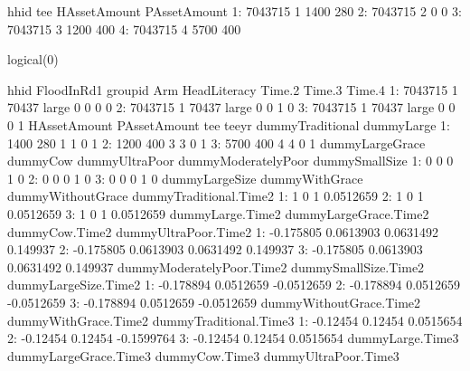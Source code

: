 \begin{Schunk}
\begin{Soutput}
      hhid tee HAssetAmount PAssetAmount
1: 7043715   1         1400          280
2: 7043715   2            0            0
3: 7043715   3         1200          400
4: 7043715   4         5700          400
\end{Soutput}
\begin{Soutput}
logical(0)
\end{Soutput}
\begin{Soutput}
      hhid FloodInRd1 groupid   Arm HeadLiteracy Time.2 Time.3 Time.4
1: 7043715          1   70437 large            0      0      0      0
2: 7043715          1   70437 large            0      0      1      0
3: 7043715          1   70437 large            0      0      0      1
   HAssetAmount PAssetAmount tee teeyr dummyTraditional dummyLarge
1:         1400          280   1     1                0          1
2:         1200          400   3     3                0          1
3:         5700          400   4     4                0          1
   dummyLargeGrace dummyCow dummyUltraPoor dummyModeratelyPoor dummySmallSize
1:               0        0              0                   1              0
2:               0        0              0                   1              0
3:               0        0              0                   1              0
   dummyLargeSize dummyWithGrace dummyWithoutGrace dummyTraditional.Time2
1:              1              0                 1              0.0512659
2:              1              0                 1              0.0512659
3:              1              0                 1              0.0512659
   dummyLarge.Time2 dummyLargeGrace.Time2 dummyCow.Time2 dummyUltraPoor.Time2
1:        -0.175805             0.0613903      0.0631492             0.149937
2:        -0.175805             0.0613903      0.0631492             0.149937
3:        -0.175805             0.0613903      0.0631492             0.149937
   dummyModeratelyPoor.Time2 dummySmallSize.Time2 dummyLargeSize.Time2
1:                 -0.178894            0.0512659           -0.0512659
2:                 -0.178894            0.0512659           -0.0512659
3:                 -0.178894            0.0512659           -0.0512659
   dummyWithoutGrace.Time2 dummyWithGrace.Time2 dummyTraditional.Time3
1:                -0.12454              0.12454              0.0515654
2:                -0.12454              0.12454             -0.1599764
3:                -0.12454              0.12454              0.0515654
   dummyLarge.Time3 dummyLargeGrace.Time3 dummyCow.Time3 dummyUltraPoor.Time3

\end{Soutput}
\end{Schunk}
